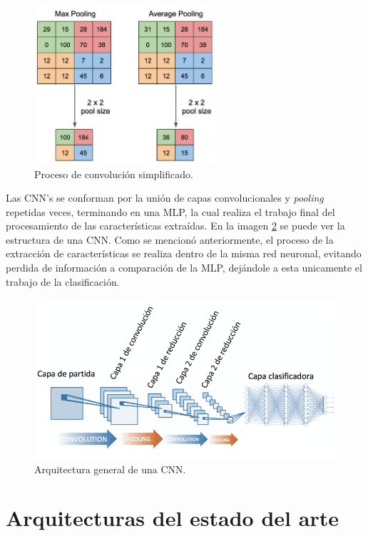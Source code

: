 \begin{figure}[h!]
\includegraphics[width=0.6\textwidth]{images/pooling.png}
\centering
\caption{Proceso de convolución simplificado\protect\cite{pooling}.}
\label{pooling}
\end{figure}

Las CNN's se conforman por la unión de capas convolucionales y \textit{pooling} repetidas veces, terminando en una MLP, la cual realiza el trabajo final del procesamiento de las características extraídas. En la imagen \ref{CNN} se puede ver la estructura de una CNN. Como se mencionó anteriormente, el proceso de la extracción de características se realiza dentro de la misma red neuronal, evitando perdida de información a comparación de la MLP, dejándole a esta unicamente el trabajo de la clasificación.

\begin{figure}[h!]
\includegraphics[width=1\textwidth]{images/CNN.png}
\centering
\caption {Arquitectura general de una CNN\protect\cite{CNN-Arquitectura}. }
\label{CNN}
\end{figure}



\section{Arquitecturas del estado del arte}

